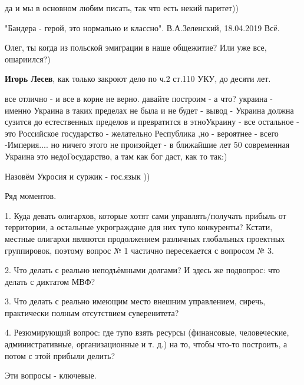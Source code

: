 \begin{itemize}
\begin{itemize} %
да и мы в основном любим писать, так что есть некий паритет))
\end{itemize} %

"Бандера - герой, это нормально и классно".
В.А.Зеленский, 18.04.2019
Всё.

\begin{itemize} %
Олег, ты когда из польской эмиграции в наше общежитие? Или уже все, ошариился?)

\textbf{Игорь Лесев}, как только закроют дело по ч.2 ст.110 УКУ, до десяти лет.


все отлично - и все в корне не верно. давайте построим - а что? украина - именно
Украина в таких пределах не была и не будет - вывод - Украина должна сузится до
естественных пределов и превратится в этноУкраину - все остальное - это
Российское государство - желательно Республика ,но - вероятнее - всего
-Империя.... но ничего этого не произойдет - в ближайшие лет 50 современная
Украина это недоГосударство, а там как бог даст, как то так:)

\end{itemize} %

Назовём Укросия и суржик - гос.язык ))


Ряд моментов.

1. Куда девать олигархов, которые хотят сами управлять/получать прибыль от
территории, а остальные укрограждане для них тупо конкуренты? Кстати, местные
олигархи являются продолжением различных глобальных проектных группировок,
поэтому вопрос № 1 частично пересекается с вопросом № 3.

2. Что делать с реально неподъёмными долгами? И здесь же подвопрос: что делать
с диктатом МВФ?

3. Что делать с реально имеющим место внешним управлением, сиречь, практически
полным отсутствием суверенитета?

4. Резюмирующий вопрос: где тупо взять ресурсы (финансовые, человеческие,
административные, организационные и т. д.) на то, чтобы что-то построить, а
потом с этой прибыли делить?

Эти вопросы - ключевые.

\begin{itemize} %


\end{itemize}
\end{itemize}
